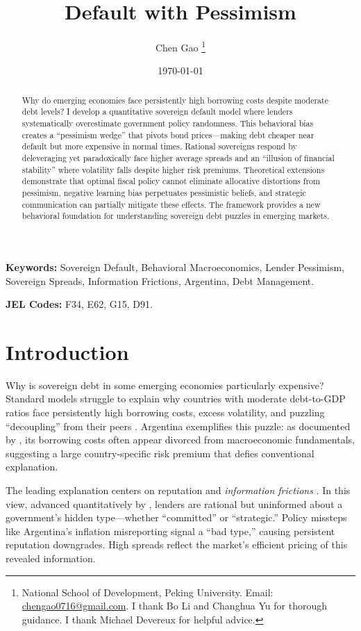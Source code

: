 \documentclass[12pt]{article}
\title{Default with Pessimism}
\author{Chen Gao \thanks{National School of Development, Peking University. Email: \url{chengao0716@gmail.com}. I thank Bo Li and Changhua Yu for thorough guidance. I thank Michael Devereux for helpful advice.}}
\date{\today}
\theoremstyle{plain}
\begin{document}
\maketitle

\begin{abstract}
	Why do emerging economies face persistently high borrowing costs despite moderate debt levels? I develop a quantitative sovereign default model where lenders systematically overestimate government policy randomness. This behavioral bias creates a ``pessimism wedge'' that pivots bond prices---making debt cheaper near default but more expensive in normal times. Rational sovereigns respond by deleveraging yet paradoxically face higher average spreads and an ``illusion of financial stability'' where volatility falls despite higher risk premiums. Theoretical extensions demonstrate that optimal fiscal policy cannot eliminate allocative distortions from pessimism, negative learning bias perpetuates pessimistic beliefs, and strategic communication can partially mitigate these effects. The framework provides a new behavioral foundation for understanding sovereign debt puzzles in emerging markets.
\end{abstract}

\noindent \textbf{Keywords:} Sovereign Default, Behavioral Macroeconomics, Lender Pessimism, Sovereign Spreads, Information Frictions, Argentina, Debt Management.

\noindent \textbf{JEL Codes:} F34, E62, G15, D91.

\clearpage

\section{Introduction}
\label{sec:intro}

Why is sovereign debt in some emerging economies particularly expensive?
Standard models struggle to explain why countries with moderate debt-to-GDP
ratios face persistently high borrowing costs, excess volatility, and puzzling
``decoupling'' from their peers \citep{TomzWright2013,
	MeyerReinhartTrebesch2022}. Argentina exemplifies this puzzle: as documented by
\citep{MorelliMoretti2023}, its borrowing costs often appear divorced from
macroeconomic fundamentals, suggesting a large country-specific risk premium
that defies conventional explanation.

The leading explanation centers on reputation and \textit{information
	frictions} \citep{ColeDowEnglish1995}. In this view, advanced quantitatively by
\citep{MorelliMoretti2023}, lenders are rational but uninformed about a
government's hidden type---whether ``committed'' or ``strategic.'' Policy
missteps like Argentina's inflation misreporting signal a ``bad type,'' causing
persistent reputation downgrades. High spreads reflect the market's efficient
pricing of this revealed information.
\end{document}
